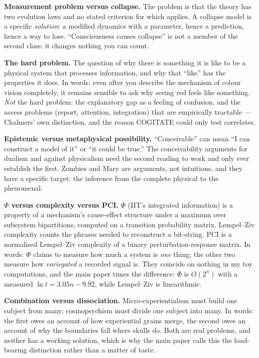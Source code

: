 \documentclass[11pt]{article}
\begin{document}
\textbf{Measurement problem versus collapse.} The problem is that the theory has two evolution laws and
no stated criterion for which applies. A collapse model is a specific \emph{solution}: a modified
dynamics with a parameter, hence a prediction, hence a way to lose. ``Consciousness causes collapse''
is not a member of the second class: it changes nothing you can count.

\textbf{The hard problem.} The question of why there is something it is like to be a physical system
that processes information, and why that ``like'' has the properties it does. In words: even after you
describe the mechanism of colour vision completely, it remains sensible to ask why seeing red feels
like something. \emph{Not} the hard problem: the explanatory gap as a feeling of confusion, and the
access problems (report, attention, integration) that are empirically tractable --- Chalmers' own
distinction, and the reason COGITATE could only test correlates.

\textbf{Epistemic versus metaphysical possibility.} ``Conceivable'' can mean ``I can construct a model
of it'' or ``it could be true.'' The conceivability arguments for dualism and against physicalism need
the second reading to work and only ever establish the first. Zombies and Mary are arguments, not
intuitions, and they have a specific target: the inference from the complete physical to the
phenomenal.

\textbf{$\Phi$ versus complexity versus PCI.} $\Phi$ (IIT's integrated information) is a property of a
mechanism's cause-effect structure under a maximum over subsystem bipartitions, computed on a
transition probability matrix. Lempel--Ziv complexity counts the phrases needed to reconstruct a
bit-string. PCI is a normalised Lempel--Ziv complexity of a binary perturbation-response matrix. In
words: $\Phi$ claims to measure how much a system is \emph{one} thing; the other two measure how
\emph{variegated} a recorded signal is. They coincide on nothing in my toy computations, and the main
paper times the difference: $\Phi$ is $O(2^n)$ with a measured $\ln t = 3.05 n - 9.92$, while
Lempel--Ziv is linearithmic.

\textbf{Combination versus dissociation.} Micro-experientialism must build one subject from many;
cosmopsychism must divide one subject into many. In words: the first owes an account of how
experiential grains merge, the second owes an account of why the boundaries fall where skulls do.
Both are real problems, and neither has a working solution, which is why the main paper calls this the
load-bearing distinction rather than a matter of taste.
\end{document}
